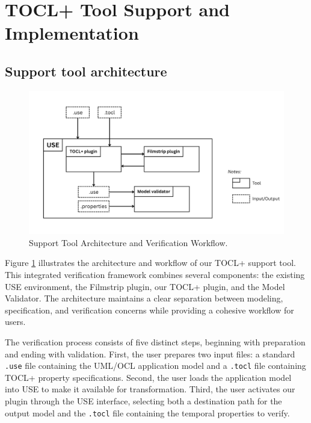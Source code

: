 \section{TOCL+ Tool Support and Implementation}

\subsection{Support tool architecture}

\begin{figure}
    \centering
    \includegraphics[width=1\textwidth]{figures/c3/Architecture_overview.png}
    \caption{Support Tool Architecture and Verification Workflow.}
    \label{sec:plugin_support_tool_architecture}
\end{figure}

\hspace{1cm} Figure \ref{sec:plugin_support_tool_architecture} illustrates the architecture and workflow of our TOCL+ support tool. This integrated verification framework combines several components: the existing USE environment, the Filmstrip plugin, our TOCL+ plugin, and the Model Validator. The architecture maintains a clear separation between modeling, specification, and verification concerns while providing a cohesive workflow for users.

The verification process consists of five distinct steps, beginning with preparation and ending with validation. First, the user prepares two input files: a standard \texttt{.use} file containing the UML/OCL application model and a \texttt{.tocl} file containing TOCL+ property specifications. Second, the user loads the application model into USE to make it available for transformation. Third, the user activates our plugin through the USE interface, selecting both a destination path for the output model and the \texttt{.tocl} file containing the temporal properties to verify.

